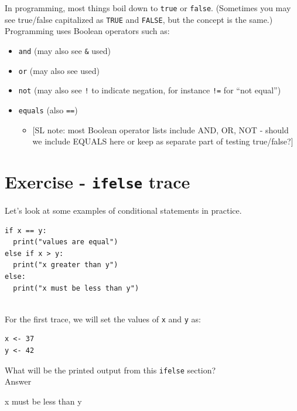 \documentclass[
]{book}
\providecommand{\tightlist}{%
  \setlength{\itemsep}{0pt}\setlength{\parskip}{0pt}}
\begin{document}
In programming, most things boil down to \texttt{true} or \texttt{false}. (Sometimes you may see true/false capitalized as \texttt{TRUE} and \texttt{FALSE}, but the concept is the same.)\\

Programming uses Boolean operators such as:\\

\begin{itemize}
\tightlist
\item
  \texttt{and} (may also see \texttt{\&} used)
\item
  \texttt{or} (may also see \texttt{\textbar{}} used)
\item
  \texttt{not} (may also see \texttt{!} to indicate negation, for instance \texttt{!=} for ``not equal'')
\item
  \texttt{equals} (also \texttt{==})

  \begin{itemize}
  \tightlist
  \item
    {[}SL note: most Boolean operator lists include AND, OR, NOT - should we include EQUALS here or keep as separate part of testing true/false?{]}
  \end{itemize}
\end{itemize}

\section{\texorpdfstring{Exercise - \texttt{ifelse} trace}{Exercise - ifelse trace}}\label{exercise---ifelse-trace}

Let's look at some examples of conditional statements in practice.

\begin{verbatim}
if x == y:
  print("values are equal")
else if x > y:
  print("x greater than y")
else:
  print("x must be less than y")
  
\end{verbatim}

For the first trace, we will set the values of \texttt{x} and \texttt{y} as:

\begin{verbatim}
x <- 37
y <- 42
\end{verbatim}

What will be the printed output from this \texttt{ifelse} section?\\

Answer

x must be less than y
\end{document}
